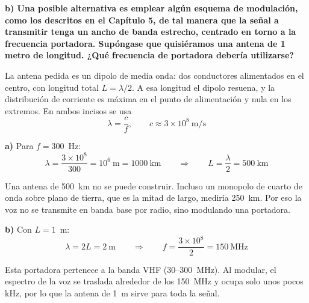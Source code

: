 \documentclass[11pt,a4paper]{article}
\begin{document}
\begin{enumerate}[label=4.\arabic*), itemsep=0.3cm]
\textbf{b) Una posible alternativa es emplear algún esquema de modulación, como los descritos en el Capítulo 5, de tal manera que la señal a transmitir tenga un ancho de banda estrecho, centrado en torno a la frecuencia portadora. Supóngase que quisiéramos una antena de 1 metro de longitud. ¿Qué frecuencia de portadora debería utilizarse?}

La antena pedida es un dipolo de media onda: dos conductores alimentados en el centro, con longitud total $L = \lambda/2$. A esa longitud el dipolo resuena, y la distribución de corriente es máxima en el punto de alimentación y nula en los extremos. En ambos incisos se usa
\[
  \lambda = \frac{c}{f}, \qquad c \approx 3 \times 10^8~\text{m/s}
\]

\begin{center}
\end{center}

\textbf{a)} Para $f = 300$~Hz:
\[
  \lambda = \frac{3 \times 10^8}{300} = 10^6~\text{m} = 1000~\text{km}
  \qquad\Longrightarrow\qquad
  L = \frac{\lambda}{2} = \boxed{500~\text{km}}
\]

Una antena de 500~km no se puede construir. Incluso un monopolo de cuarto de onda sobre plano de tierra, que es la mitad de largo, mediría 250~km. Por eso la voz no se transmite en banda base por radio, sino modulando una portadora.

\textbf{b)} Con $L = 1$~m:
\[
  \lambda = 2L = 2~\text{m}
  \qquad\Longrightarrow\qquad
  f = \frac{3 \times 10^8}{2} = \boxed{150~\text{MHz}}
\]

Esta portadora pertenece a la banda VHF (30--300~MHz). Al modular, el espectro de la voz se traslada alrededor de los 150~MHz y ocupa solo unos pocos kHz, por lo que la antena de 1~m sirve para toda la señal.


\end{enumerate}
\end{document}
